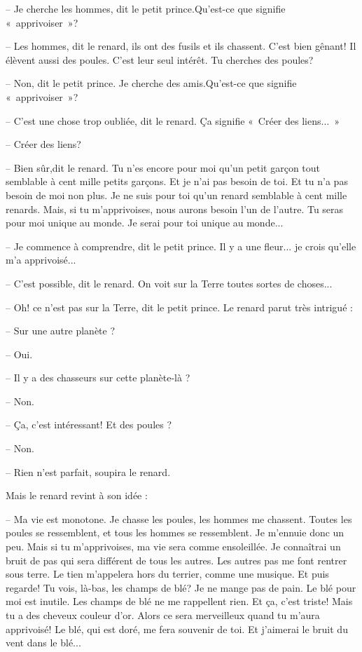 \documentclass[a4paper]{report}
\begin{document}
-- Je cherche les hommes, dit le petit prince.Qu'est-ce que signifie «~apprivoiser~»?

-- Les hommes, dit le renard, ils ont des fusils et ils chassent. C'est bien gênant! Il élèvent aussi des poules. C'est leur seul intérêt. Tu cherches des poules?

-- Non, dit le petit prince. Je cherche des amis.Qu'est-ce que signifie «~apprivoiser~»?

-- C'est une chose trop oubliée, dit le renard. Ça signifie «~Créer des liens...~»

-- Créer des liens?

-- Bien sûr,dit le renard. Tu n'es encore pour moi qu'un petit garçon tout semblable à cent mille petits garçons. Et je n'ai pas besoin de toi. Et tu n'a pas besoin de moi non plus. Je ne suis pour toi qu'un renard semblable à cent mille renards. Mais, si tu m'apprivoises, nous aurons besoin l'un de l'autre. Tu seras pour moi unique au monde. Je serai pour toi unique au monde...

-- Je commence à comprendre, dit le petit prince. Il y a une fleur... je crois qu'elle m'a apprivoisé...

-- C'est possible, dit le renard. On voit sur la Terre toutes sortes de choses...

-- Oh! ce n'est pas sur la Terre, dit le petit prince. Le renard parut très intrigué :

-- Sur une autre planète ?

-- Oui.

-- Il y a des chasseurs sur cette planète-là ?

-- Non.

-- Ça, c'est intéressant! Et des poules ?

-- Non.

-- Rien n'est parfait, soupira le renard.

Mais le renard revint à son idée :

-- Ma vie est monotone. Je chasse les poules, les hommes me chassent. Toutes les poules se ressemblent, et tous les hommes se ressemblent. Je m'ennuie donc un peu. Mais si tu m'apprivoises, ma vie sera comme ensoleillée. Je connaîtrai un bruit de pas qui sera différent de tous les autres. Les autres pas me font rentrer sous terre. Le tien m'appelera hors du terrier, comme une musique. Et puis regarde! Tu vois, là-bas, les champs de blé? Je ne mange pas de pain. Le blé pour moi est inutile. Les champs de blé ne me rappellent rien. Et ça, c'est triste! Mais tu a des cheveux couleur d'or. Alors ce sera merveilleux quand tu m'aura apprivoisé! Le blé, qui est doré, me fera souvenir de toi. Et j'aimerai le bruit du vent dans le blé...
\end{document}
